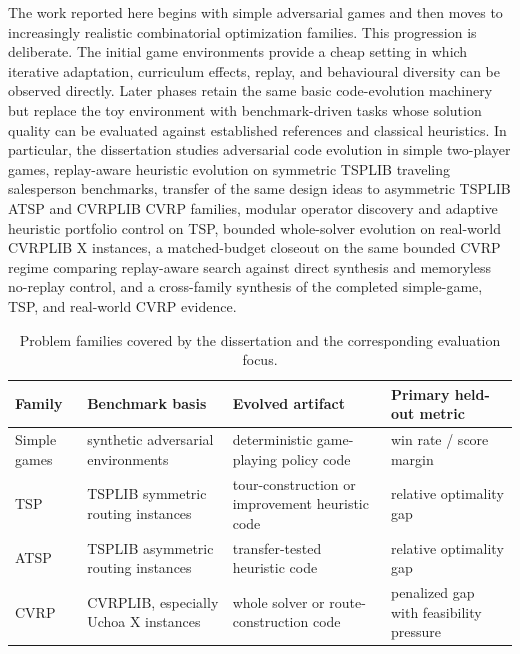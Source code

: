 The work reported here begins with simple adversarial games and then moves to increasingly
realistic combinatorial optimization families. This progression is deliberate. The initial game
environments provide a cheap setting in which iterative adaptation, curriculum effects, replay,
and behavioural diversity can be observed directly. Later phases retain the same basic
code-evolution machinery but replace the toy environment with benchmark-driven tasks whose solution
quality can be evaluated against established references and classical heuristics. In particular,
the dissertation studies adversarial code evolution in simple two-player games, replay-aware
heuristic evolution on symmetric TSPLIB traveling salesperson benchmarks, transfer of the same
design ideas to asymmetric TSPLIB ATSP and CVRPLIB CVRP families, modular operator discovery and
adaptive heuristic portfolio control on TSP, bounded whole-solver evolution on real-world CVRPLIB
X instances, a matched-budget closeout on the same bounded CVRP regime comparing replay-aware
search against direct synthesis and memoryless no-replay control, and a cross-family synthesis of
the completed simple-game, TSP, and real-world CVRP evidence.

\begin{table}[t]
\centering
\scriptsize
\setlength{\tabcolsep}{3pt}
\begin{tabular}{
  >{\raggedright\arraybackslash}p{0.65in}
  >{\raggedright\arraybackslash}p{1.1in}
  >{\raggedright\arraybackslash}p{1.35in}
  >{\raggedright\arraybackslash}p{1.1in}
}
\toprule
Family & Benchmark basis & Evolved artifact & Primary held-out metric \\
\midrule
Simple games & synthetic adversarial environments & deterministic game-playing policy code & win rate / score margin \\
TSP & TSPLIB symmetric routing instances & tour-construction or improvement heuristic code & relative optimality gap \\
ATSP & TSPLIB asymmetric routing instances & transfer-tested heuristic code & relative optimality gap \\
CVRP & CVRPLIB, especially Uchoa X instances & whole solver or route-construction code & penalized gap with feasibility pressure \\
\bottomrule
\end{tabular}
\caption[Problem families and evaluation focus]{Problem families covered by the dissertation and the corresponding evaluation focus.}
\label{tab:intro-families}
\end{table}

